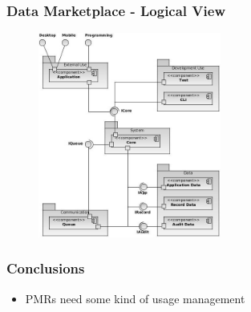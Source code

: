 \documentclass[t, 10pt]{beamer}
\begin{document}
\begin{frame}
\frametitle{Data Marketplace - Logical View}

\begin{figure}
\includegraphics[width = 6cm]{HisbSystemArch}
\end{figure}

\end{frame}

\begin{frame}
\frametitle{Conclusions}

\begin{itemize}
\item PMRs need some kind of usage management
\end{itemize}

\end{frame}

%
%
\end{document}
